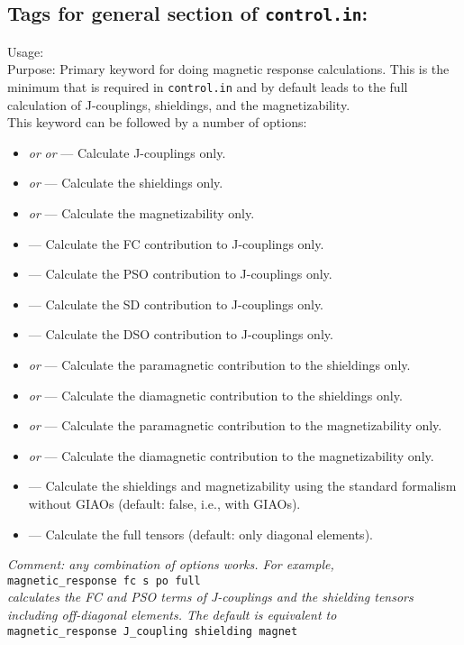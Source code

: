 \newpage

\subsection*{Tags for general section of \texttt{control.in}:}
{
  \noindent
  Usage:  \\[1.0ex]
  Purpose: Primary keyword for doing magnetic response calculations. This is the minimum that is required in \texttt{control.in} and by default leads to the full calculation of J-couplings, shieldings, and the magnetizability.\\[1.0ex]
  This keyword can be followed by a number of options:
  \begin{itemize}
  \item {} \textit{or}  \textit{or}  --- Calculate J-couplings only.
  \item {} \textit{or}  --- Calculate the shieldings only.
  \item {} \textit{or}  --- Calculate the magnetizability only.
  \item {} --- Calculate the FC contribution to J-couplings only.
  \item {} --- Calculate the PSO contribution to J-couplings only.
  \item {} --- Calculate the SD contribution to J-couplings only.
  \item {} --- Calculate the DSO contribution to J-couplings only.
  \item {} \textit{or}  --- Calculate the paramagnetic contribution to the shieldings only.
  \item {} \textit{or}  --- Calculate the diamagnetic contribution to the shieldings only.
  \item {} \textit{or}  --- Calculate the paramagnetic contribution to the magnetizability only.
  \item {} \textit{or}  --- Calculate the diamagnetic contribution to the magnetizability only.
  \item {} --- Calculate the shieldings and magnetizability using the standard formalism without GIAOs (default: false, i.e., with GIAOs).
  \item {} --- Calculate the full tensors (default: only diagonal elements).
  \end{itemize}
  \textit{Comment: any combination of options works. For example,} \\ \texttt{magnetic\_response fc s po full} \\
  \textit{calculates the FC and PSO terms of J-couplings and the shielding tensors including off-diagonal elements. The default is equivalent to} \\
  \texttt{magnetic\_response J\_coupling shielding magnet}
}

